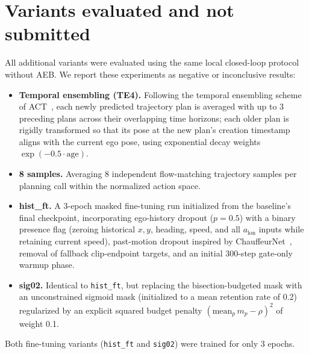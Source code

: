 \section{Variants evaluated and not submitted}
\label{app:others}
All additional variants were evaluated using the same local closed-loop protocol without AEB. We report these experiments as negative or inconclusive results:
\begin{itemize}\setlength\itemsep{0pt}
\item \textbf{Temporal ensembling (TE4).} Following the temporal ensembling scheme of ACT~\cite{act}, each newly predicted trajectory plan is averaged with up to 3 preceding plans across their overlapping time horizons; each older plan is rigidly transformed so that its pose at the new plan's creation timestamp aligns with the current ego pose, using exponential decay weights $\exp(-0.5\cdot\mathrm{age})$.
\item \textbf{8 samples.} Averaging 8 independent flow-matching trajectory samples per planning call within the normalized action space.
\item \textbf{hist\_ft.} A 3-epoch masked fine-tuning run initialized from the baseline's final checkpoint, incorporating ego-history dropout ($p=0.5$) with a binary presence flag (zeroing historical $x, y$, heading, speed, and all $a_\mathrm{lon}$ inputs while retaining current speed), past-motion dropout inspired by ChauffeurNet~\cite{chauffeurnet}, removal of fallback clip-endpoint targets, and an initial 300-step gate-only warmup phase.
\item \textbf{sig02.} Identical to \texttt{hist\_ft}, but replacing the bisection-budgeted mask with an unconstrained sigmoid mask (initialized to a mean retention rate of 0.2) regularized by an explicit squared budget penalty $(\mathrm{mean}_p\,m_p-\rho)^2$ of weight 0.1.
\end{itemize}
Both fine-tuning variants (\texttt{hist\_ft} and \texttt{sig02}) were trained for only 3 epochs.

